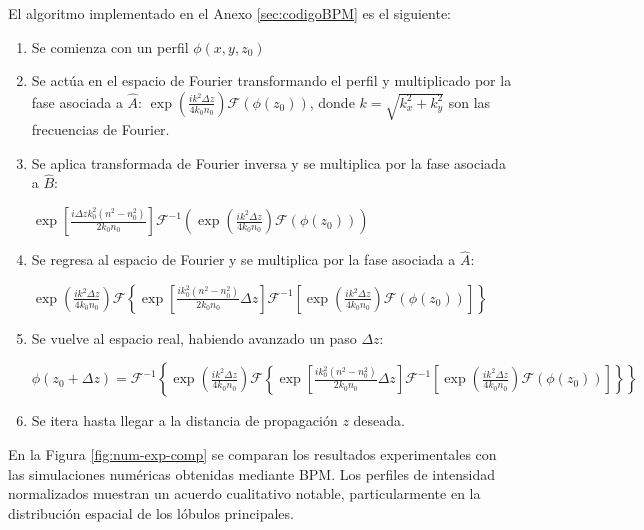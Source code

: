 El algoritmo implementado en el Anexo \ref{sec:codigoBPM} es el siguiente: \begin{enumerate}
	\item   Se comienza con un perfil $\phi(x, y, z_0)$
\item   Se actúa en el espacio de Fourier transformando el perfil y multiplicado por la fase asociada a $\hat{A}$: $\exp\left(\frac{ik^2\Delta z}{4k_0 n_0}\right)\mathcal{F}(\phi(z_0))$, donde $k=\sqrt{k_x^2 + k_y^2}$ son las frecuencias de Fourier.
\item   Se aplica transformada de Fourier inversa y se multiplica por la fase asociada a $\hat{B}$: 

$\exp\left[\frac{i\Delta z k_0^2(n^2-n_0^2)}{2 k_0n_0}\right]\mathcal{F}^{-1}\left(\exp\left(\frac{ik^2 \Delta z}{4k_0 n_0}\right)\mathcal{F}(\phi(z_0))\right)$
\item  Se regresa al espacio de Fourier y se multiplica por la fase asociada a $\hat{A}$:
 
$\exp\left(\frac{ik^2\Delta z}{4k_0 n_0}\right)\mathcal{F}\left\{\exp\left[\frac{ik_0^2(n^2-n_0^2)}{2 k_0n_0}\Delta z \right]\mathcal{F}^{-1}\left[\exp\left(\frac{ik^2\Delta z}{4k_0 n_0}\right)\mathcal{F}(\phi(z_0))\right]\right\}$
\item Se vuelve al espacio real, habiendo avanzado un paso $\Delta z$:

$\phi(z_0+\Delta z)=\mathcal{F}^{-1}\left\{\exp\left(\frac{ik^2\Delta z}{4k_0 n_0}\right)\mathcal{F}\left\{\exp\left[\frac{i k_0^2(n^2-n_0^2)}{2 k_0n_0}\Delta z\right]\mathcal{F}^{-1}\left[\exp\left(\frac{ik^2\Delta z}{4k_0 n_0}\right)\mathcal{F}(\phi(z_0))\right]\right\} \right\}$

\item Se itera hasta llegar a la distancia de propagación $z$ deseada.
\end{enumerate} En la Figura \ref{fig:num-exp-comp} se comparan los resultados experimentales con las simulaciones numéricas obtenidas mediante BPM. Los perfiles de intensidad normalizados muestran un acuerdo cualitativo notable, particularmente en la distribución espacial de los lóbulos principales.
